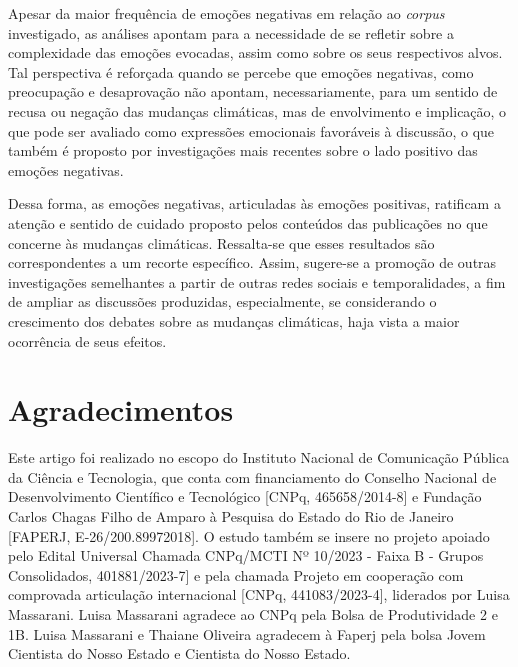\documentclass[portuguese]{textolivre}
\begin{document}
Apesar da maior frequência de emoções negativas em relação ao \textit{corpus} investigado, as análises apontam para a necessidade de se refletir sobre a complexidade das emoções evocadas, assim como sobre os seus respectivos alvos. Tal perspectiva é reforçada quando se percebe que emoções negativas, como preocupação e desaprovação não apontam, necessariamente, para um sentido de recusa ou negação das mudanças climáticas, mas de envolvimento e implicação, o que pode ser avaliado como expressões emocionais favoráveis à discussão, o que também é proposto por investigações mais recentes sobre o lado positivo das emoções negativas.

Dessa forma, as emoções negativas, articuladas às emoções positivas, ratificam a atenção e sentido de cuidado proposto pelos conteúdos das publicações no que concerne às mudanças climáticas. Ressalta-se que esses resultados são correspondentes a um recorte específico. Assim, sugere-se a promoção de outras investigações semelhantes a partir de outras redes sociais e temporalidades, a fim de ampliar as discussões produzidas, especialmente, se considerando o crescimento dos debates sobre as mudanças climáticas, haja vista a maior ocorrência de seus efeitos.



\section{Agradecimentos}\label{sec-resumo}
Este artigo foi realizado no escopo do Instituto Nacional de Comunicação Pública da Ciência e Tecnologia, que conta com financiamento do Conselho Nacional de Desenvolvimento Científico e Tecnológico [CNPq, 465658/2014-8] e Fundação Carlos Chagas Filho de Amparo à Pesquisa do Estado do Rio de Janeiro [FAPERJ, E-26/200.89972018]. O estudo também se insere no projeto apoiado pelo Edital Universal Chamada CNPq/MCTI Nº 10/2023 - Faixa B - Grupos Consolidados, 401881/2023-7] e pela chamada Projeto em cooperação com comprovada articulação internacional [CNPq, 441083/2023-4], liderados por Luisa Massarani. Luisa Massarani agradece ao CNPq pela Bolsa de Produtividade 2 e 1B. Luisa Massarani e Thaiane Oliveira agradecem à Faperj pela bolsa Jovem Cientista do Nosso Estado e Cientista do Nosso Estado.


\printbibliography\label{sec-bib}
\end{document}
